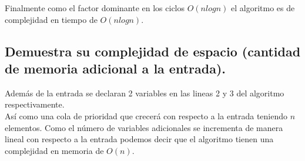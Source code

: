 \documentclass[12pt]{article}
\begin{document}
 Finalmente como el factor dominante en los ciclos $O(nlogn)$ el algoritmo es de complejidad en tiempo de $O(nlogn)$.
 \subsection{Demuestra su complejidad de espacio (cantidad de memoria adicional a la entrada).}
 Además de la entrada se declaran 2 variables en las lineas 2 y 3 del algoritmo respectivamente.\\
 Así como una cola de prioridad que crecerá con respecto a la entrada teniendo $n$ elementos.
 Como el número de variables adicionales se incrementa de manera lineal con respecto a la entrada podemos decir que el algoritmo tienen una complejidad en memoria de $O(n)$.
\end{document}
